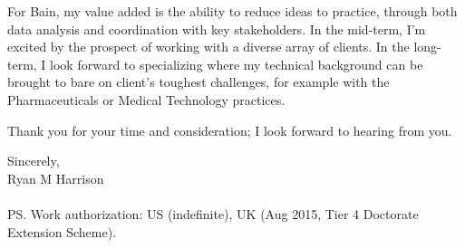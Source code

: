 \documentclass[a4paper]{../res}
\begin{document}
\begin{sloppypar}
\begin{resume}
For Bain, my value added is the ability to reduce ideas to practice, through both data analysis and coordination with key stakeholders. In the mid-term, I'm excited by the prospect of working with a diverse array of clients. In the long-term, I look forward to specializing where my technical background can be brought to bare on client's toughest challenges, for example with the Pharmaceuticals or Medical Technology practices.

Thank you for your time and consideration; I look forward to hearing from you.

Sincerely,
\\
Ryan M Harrison \\ \\
PS. Work authorization: US (indefinite), UK (Aug 2015, Tier 4 Doctorate Extension Scheme).

\end{resume} 
\end{sloppypar}
\end{document}
